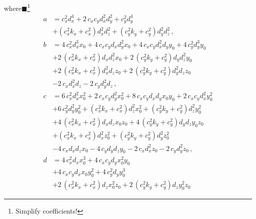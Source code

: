 \documentclass[12pt,a4paper,twoside,openright,BCOR10mm,headsepline,titlepage,abstracton,chapterprefix,final]{scrreprt}
\newcommand{\remark}[1]{{\color{red}$\blacksquare$}\footnote{{\color{red}#1}}}
\begin{document}
where\remark{Simplify coefficients!}
\begin{subequations}
 \begin{align}
  a &= c_{x}^{2} d_{x}^{4} + 2 \, c_{x} c_{y} d_{x}^{2} d_{y}^{2} + c_{y}^{2} d_{y}^{4} \nonumber\\&
       + {\left(c_{x}^{2} k_{x} + c_{x}^{2}\right)} d_{x}^{2} d_{z}^{2} + {\left(c_{y}^{2} k_{y} + c_{y}^{2}\right)} d_{y}^{2} d_{z}^{2}\,,\\
  b &= 4 \, c_{x}^{2} d_{x}^{3} x_{0} + 4 \, c_{x} c_{y} d_{x} d_{y}^{2} x_{0} + 4 \, c_{x} c_{y} d_{x}^{2} d_{y} y_{0} + 4 \, c_{y}^{2} d_{y}^{3} y_{0}\nonumber\\&
       + 2 \, {\left(c_{x}^{2} k_{x} + c_{x}^{2}\right)} d_{x} d_{z}^{2} x_{0} + 2 \, {\left(c_{y}^{2} k_{y} + c_{y}^{2}\right)} d_{y} d_{z}^{2} y_{0}\nonumber\\&
       + 2 \, {\left(c_{x}^{2} k_{x} + c_{x}^{2}\right)} d_{x}^{2} d_{z} z_{0} + 2 \, {\left(c_{y}^{2} k_{y} + c_{y}^{2}\right)} d_{y}^{2} d_{z} z_{0}\nonumber\\&
       - 2 \, c_{x} d_{x}^{2} d_{z} - 2 \, c_{y} d_{y}^{2} d_{z}\,,\\
  c &= 6 \, c_{x}^{2} d_{x}^{2} x_{0}^{2} + 2 \, c_{x} c_{y} d_{y}^{2} x_{0}^{2} + 8 \, c_{x} c_{y} d_{x} d_{y} x_{0} y_{0} + 2 \, c_{x} c_{y} d_{x}^{2} y_{0}^{2}\nonumber\\&
     + 6 \, c_{y}^{2} d_{y}^{2} y_{0}^{2} + {\left(c_{x}^{2} k_{x} + c_{x}^{2}\right)} d_{z}^{2} x_{0}^{2} + {\left(c_{y}^{2} k_{y} + c_{y}^{2}\right)} d_{z}^{2} y_{0}^{2}\nonumber\\&
     + 4 \, {\left(c_{x}^{2} k_{x} + c_{x}^{2}\right)} d_{x} d_{z} x_{0} z_{0} + 4 \, {\left(c_{y}^{2} k_{y} + c_{y}^{2}\right)} d_{y} d_{z} y_{0} z_{0}\nonumber\\&
     + {\left(c_{x}^{2} k_{x} + c_{x}^{2}\right)} d_{x}^{2} z_{0}^{2} + {\left(c_{y}^{2} k_{y} + c_{y}^{2}\right)} d_{y}^{2} z_{0}^{2}\nonumber\\&
     - 4 \, c_{x} d_{x} d_{z} x_{0} - 4 \, c_{y} d_{y} d_{z} y_{0} - 2 \, c_{x} d_{x}^{2} z_{0} - 2 \, c_{y} d_{y}^{2} z_{0}\,,\\
  d &= 4 \, c_{x}^{2} d_{x} x_{0}^{3} + 4 \, c_{x} c_{y} d_{y} x_{0}^{2} y_{0}\nonumber\\&
     + 4 \, c_{x} c_{y} d_{x} x_{0} y_{0}^{2} + 4 \, c_{y}^{2} d_{y} y_{0}^{3}\nonumber\\&
     + 2 \, {\left(c_{x}^{2} k_{x} + c_{x}^{2}\right)} d_{z} x_{0}^{2} z_{0} + 2 \, {\left(c_{y}^{2} k_{y} + c_{y}^{2}\right)} d_{z} y_{0}^{2} z_{0} 

\end{align}
\end{subequations}
\end{document}
